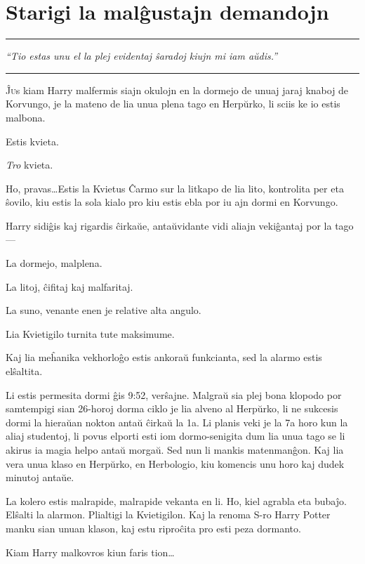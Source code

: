 \chapter{Starigi la malĝustajn demandojn}

\begin{center}\rule{3in}{0.4pt}\end{center}

\emph{``Tio estas unu el la plej evidentaj ŝaradoj kiujn mi iam aŭdis.''}  

\begin{center}\rule{3in}{0.4pt}\end{center}

\lettrine{Ĵ}us kiam Harry malfermis siajn okulojn en la dormejo
de unuaj jaraj knaboj de Korvungo, je la mateno de lia unua plena
tago en Herpŭrko, li sciis ke io estis malbona.

Estis kvieta.

\emph{Tro} kvieta.

Ho, pravas\ldots Estis la Kvietus Ĉarmo sur la litkapo de lia lito,
kontrolita per eta ŝovilo, kiu estis la sola kialo pro kiu estis ebla
por iu ajn dormi en Korvungo.

Harry sidiĝis kaj rigardis ĉirkaŭe, antaŭvidante vidi aliajn vekiĝantaj
por la tago—

La dormejo, malplena.

La litoj, ĉifitaj kaj malfaritaj.

La suno, venante enen je relative alta angulo.

Lia Kvietigilo turnita tute maksimume.

Kaj lia meĥanika vekhorloĝo estis ankoraŭ funkcianta, sed la alarmo
estis elŝaltita.

Li estis permesita dormi ĝis 9:52, verŝajne. Malgraŭ sia plej bona
klopodo por samtempigi sian 26-horoj dorma ciklo je lia alveno al
Herpŭrko, li ne sukcesis dormi la hieraŭan nokton antaŭ ĉirkaŭ la 1a.
Li planis veki je la 7a horo kun la aliaj studentoj, li povus elporti
esti iom dormo-senigita dum lia unua tago se li akirus ia magia helpo
antaŭ morgaŭ. Sed nun li mankis matenmanĝon. Kaj lia vera unua klaso
en Herpŭrko, en Herbologio, kiu komencis unu horo kaj dudek minutoj
antaŭe.

La kolero estis malrapide, malrapide vekanta en li. Ho, kiel agrabla
eta bubaĵo. Elŝalti la alarmon. Plialtigi la Kvietigilon. Kaj la
renoma S-ro Harry Potter manku sian unuan klason, kaj estu riproĉita
pro esti peza dormanto.

Kiam Harry malkovros kiun faris tion\ldots

